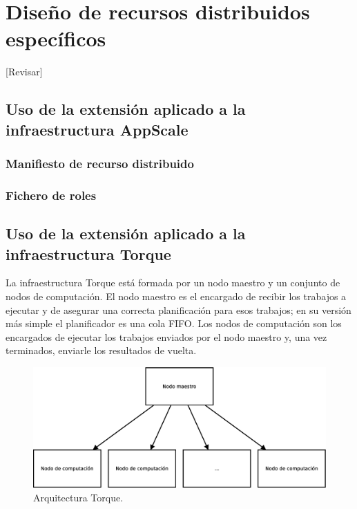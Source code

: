 \chapter{Diseño de recursos distribuidos específicos}
\label{cap:disenyo}


[Revisar]\\

\section{Uso de la extensión aplicado a la infraestructura AppScale}
\subsection{Manifiesto de recurso distribuido}
\subsection{Fichero de roles}


\section{Uso de la extensión aplicado a la infraestructura Torque}

La infraestructura Torque está formada por un nodo maestro y un conjunto de nodos de computación. El nodo maestro es el encargado de recibir los trabajos a ejecutar y de asegurar una correcta planificación para esos trabajos; en su versión más simple el planificador es una cola FIFO. Los nodos de computación son los encargados de ejecutar los trabajos enviados por el nodo maestro y, una vez terminados, enviarle los resultados de vuelta.

\begin{figure} [!htbp]
  \centering
  \includegraphics[width=13.5cm]{figuras/Arquitectura_Torque.eps}
  \caption{Arquitectura Torque.}
\label{figure:arquitectura-torque}
\end{figure}

